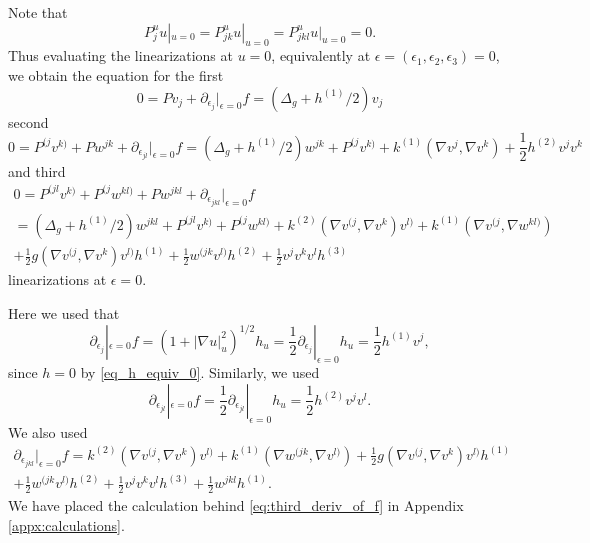 \documentclass[12pt]{amsart}
\def\p{\partial}
\theoremstyle{definition}
\theoremstyle{remark}
\newcommand{\abs}[1]{\lvert #1 \rvert}
\newcommand{\eps}{\epsilon}
\begin{document}
Note that 
\[
P_j^uu|_{u=0}=P_{jk}^uu|_{u=0}=P_{jkl}^uu|_{u=0}=0.
\]
Thus evaluating the linearizations at $u=0$, equivalently at $\eps=(\eps_1,\eps_2,\eps_3)=0$, we obtain the equation for the first
\[
  0=Pv_j+\p_{\eps_j}|_{\eps=0}f=(\Delta_g+h^{(1)}/2)v_j 
\]
second
\[
  0=P^{(j}v^{k)}+P w^{jk}+\p_{\eps_{jl}}|_{\eps=0}f=(\Delta_g+h^{(1)}/2)w^{jk}+P^{(j}v^{k)}+k^{(1)}(\nabla v^j,\nabla v^k)+\frac{1}{2}h^{(2)}v^jv^k
\]
and third
\begin{multline*}
  0=P^{(jl}v^{k)}+P^{(j}w^{kl)}+P w^{jkl}+\p_{\eps_{jkl}}|_{\eps=0}f \\
  =(\Delta_g+h^{(1)}/2)w^{jkl}+P^{(jl}v^{k)}+P^{(j}w^{kl)}+k^{(2)}(\nabla v^{(j},\nabla v^k)v^{l)}+k^{(1)}(\nabla v^{(j},\nabla w^{kl)}) \\
  +\frac{1}{2}g(\nabla v^{(j},\nabla v^k)v^{l)}h^{(1)} +\frac{1}{2}w^{(jk}v^{l)}h^{(2)}+\frac{1}{2}v^{j}v^kv^{l}h^{(3)} %
\end{multline*}
linearizations at $\eps=0$. 

Here we used that
\begin{equation*}
 \p_{\eps_j}|_{\eps=0}f=(1+\abs{\nabla u}^2_{u})^{1/2}h_u=\frac{1}{2}\p_{\eps_j}|_{\eps=0}h_u=\frac{1}{2}h^{(1)}v^j,
\end{equation*}
since $h=0$ by \eqref{eq_h_equiv_0}. Similarly, we used
\begin{equation*}
 \p_{\eps_{jl}}|_{\eps=0}f=\frac{1}{2}\p_{\eps_{jl}}|_{\eps=0}h_u=\frac{1}{2}h^{(2)}v^jv^l.
\end{equation*}
We also used 
\begin{multline}\label{eq:third_deriv_of_f}
 \p_{\eps_{jkl}}|_{\eps=0}f
=k^{(2)}(\nabla v^{(j},\nabla v^k)v^{l)}+k^{(1)}(\nabla w^{(jk},\nabla v^{l)})+\frac{1}{2}g(\nabla v^{(j},\nabla v^k)v^{l)}h^{(1)} \\
 +\frac{1}{2}w^{(jk}v^{l)}h^{(2)}+\frac{1}{2}v^{j}v^{k}v^{l}h^{(3)}+\frac{1}{2}w^{jkl}h^{(1)}.
\end{multline}
We have placed the calculation behind \eqref{eq:third_deriv_of_f} in Appendix \ref{appx:calculations}.
\end{document}
